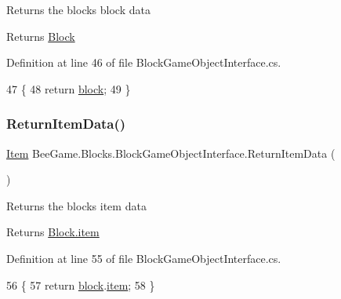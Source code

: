 Returns the block\textquotesingle{}s block data 

\begin{DoxyReturn}{Returns}
\hyperlink{class_bee_game_1_1_blocks_1_1_block}{Block}
\end{DoxyReturn}


Definition at line 46 of file Block\+Game\+Object\+Interface.\+cs.


\begin{DoxyCode}
47         \{
48             \textcolor{keywordflow}{return} \hyperlink{class_bee_game_1_1_blocks_1_1_block_game_object_interface_a238bad3b956ec84c8b1cc3127948b75d}{block};
49         \}
\end{DoxyCode}
\mbox{\label{class_bee_game_1_1_blocks_1_1_block_game_object_interface_a224ae292be961a0c3b7675e5a85ddb1b}} 
\subsubsection{\texorpdfstring{Return\+Item\+Data()}{ReturnItemData()}}
{\footnotesize\ttfamily \hyperlink{struct_bee_game_1_1_items_1_1_item}{Item} Bee\+Game.\+Blocks.\+Block\+Game\+Object\+Interface.\+Return\+Item\+Data (\begin{DoxyParamCaption}{ }\end{DoxyParamCaption})}



Returns the blocks item data 

\begin{DoxyReturn}{Returns}
\hyperlink{class_bee_game_1_1_blocks_1_1_block_addc8d61c8acab21b0f15df5fed804f11}{Block.\+item}
\end{DoxyReturn}


Definition at line 55 of file Block\+Game\+Object\+Interface.\+cs.


\begin{DoxyCode}
56         \{
57             \textcolor{keywordflow}{return} \hyperlink{class_bee_game_1_1_blocks_1_1_block_game_object_interface_a238bad3b956ec84c8b1cc3127948b75d}{block}.\hyperlink{class_bee_game_1_1_blocks_1_1_block_addc8d61c8acab21b0f15df5fed804f11}{item};
58         \}
\end{DoxyCode}
\mbox{\label{class_bee_game_1_1_blocks_1_1_block_game_object_interface_a3ddd5f34156385516a9ad3572160fd99}} 
